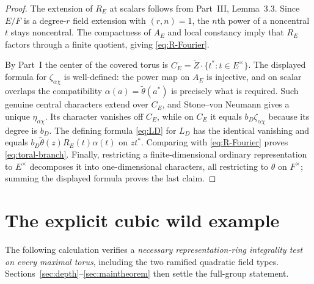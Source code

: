 \documentclass[11pt]{article}
\newcommand{\tth}{\widetilde\theta}
\theoremstyle{plain}
\theoremstyle{definition}
\begin{document}
\begin{proof}
The extension of $R_E$ at scalars follows from Part~III,
Lemma~3.3.  Since $E/F$ is a degree-$r$ field extension with
$(r,n)=1$, the $n$th power of a noncentral $t$ stays noncentral.
The compactness of $A_E$ and local constancy imply that $R_E$
factors through a finite quotient, giving \eqref{eq:R-Fourier}.

By Part~I the center of the covered torus is
$C_E=\widetilde Z\cdot\{t^*:t\in E^\times\}$.  The displayed
formula for $\zeta_{\alpha\chi}$ is well-defined: the
power map on $A_E$ is injective, and on scalar overlaps the
compatibility $\alpha(a)=\tth(a^*)$ is precisely
what is required.  Such genuine central characters extend over
$C_E$, and Stone--von Neumann gives a unique $\eta_{\alpha\chi}$.
Its character vanishes off $C_E$, while on $C_E$ it equals
$b_D\zeta_{\alpha\chi}$ because its degree is $b_D$.
The defining formula \eqref{eq:LD} for $L_D$ has the identical
vanishing and equals $b_D\tth(z)R_E(t)\alpha(t)$
on $z t^*$.  Comparing with \eqref{eq:R-Fourier} proves
\eqref{eq:toral-branch}.  Finally, restricting a finite-dimensional
ordinary representation to $E^\times$ decomposes it into
one-dimensional characters, all restricting to $\theta$ on
$F^\times$; summing the displayed formula proves the last claim.
\end{proof}

\section{The explicit cubic wild example}\label{sec:examplewild}
The following calculation verifies a \emph{necessary representation-ring
integrality test on every maximal torus}, including the two ramified
quadratic field types.  Sections~\ref{sec:depth}--\ref{sec:maintheorem}
then settle the full-group statement.
\end{document}
